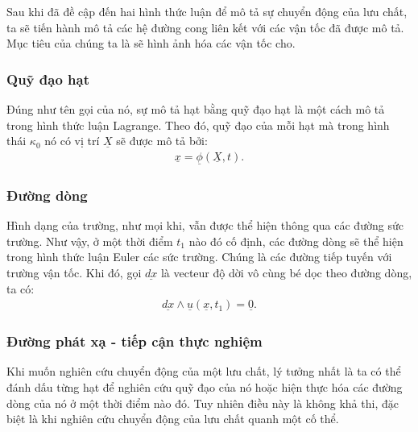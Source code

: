 \documentclass[../../../main.tex]{subfiles}
\begin{document}
    Sau khi đã đề cập đến hai hình thức luận để mô tả sự chuyển động của lưu chất, ta sẽ tiến hành mô tả các hệ đường cong liên kết với các vận tốc đã được mô tả. Mục tiêu của chúng ta là sẽ hình ảnh hóa các vận tốc cho.
	\subsubsection{Quỹ đạo hạt}
		Đúng như tên gọi của nó, sự mô tả hạt bằng quỹ đạo hạt là một cách mô tả trong hình thức luận Lagrange. Theo đó, quỹ đạo của mỗi hạt mà trong hình thái $\kappa_0$ nó có vị trí $\underline{X}$ sẽ được mô tả bởi:
			\begin{align}
				\underline{x}=\underline{\phi}\left(\underline{X},t\right).
			\end{align}
	\subsubsection{Đường dòng}
		Hình dạng của trường, như mọi khi, vẫn được thể hiện thông qua các đường sức trường. Như vậy, ở một thời điểm $t_1$ nào đó cố định, các đường dòng sẽ thể hiện trong hình thức luận Euler các sức trường. Chúng là các đường tiếp tuyến với trường vận tốc. Khi đó, gọi $\underline{dx}$ là vecteur độ dời vô cùng bé dọc theo đường dòng, ta có:
			\begin{align}
				\underline{dx}\wedge\underline{u}\left(\underline{x},t_1\right)=\underline{0}.
			\end{align}
	\subsubsection{Đường phát xạ - tiếp cận thực nghiệm}
		Khi muốn nghiên cứu chuyển động của một lưu chất, lý tưởng nhất là ta có thể đánh dấu từng hạt để nghiên cứu quỹ đạo của nó hoặc hiện thực hóa các đường dòng của nó ở một thời điểm nào đó. Tuy nhiên điều này là không khả thi, đặc biệt là khi nghiên cứu chuyển động của lưu chất quanh một cố thể.
		
\end{document}
